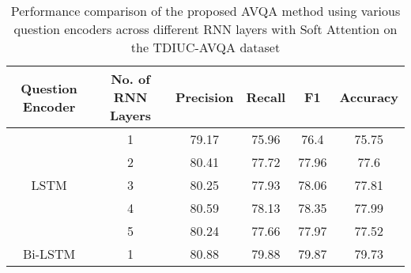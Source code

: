 \documentclass[runningheads]{llncs}
\begin{document}
\begin{table}[!hbtp]
\caption{Performance comparison of the proposed AVQA method using various question encoders across different RNN layers with Soft Attention on the TDIUC-AVQA dataset}
\label{Q2}
\begin{tabular}{|c|c|c|c|c|c|}
\toprule
\textbf{Question Encoder} & \textbf{No. of RNN Layers} & \textbf{Precision} & \textbf{Recall} & \textbf{F1} & \textbf{Accuracy} \\
\hline
\multirow{5}{*}{LSTM}   & 1 & 79.17                & 75.96                & 76.4                 & 75.75                \\
                        & 2 & 80.41                & 77.72                & 77.96                & 77.6                 \\ 
                        & 3 & 80.25                & 77.93                & 78.06                & 77.81                \\ 
                        & 4 & 80.59                & 78.13                & 78.35                & 77.99                \\ 
                        & 5 & 80.24                & 77.66                & 77.97                & 77.52                \\ \hline
\multirow{5}{*}{Bi-LSTM} & 1 & 80.88                & 79.88                & 79.87                & 79.73                \\ 


\end{tabular}
\end{table}
\end{document}
